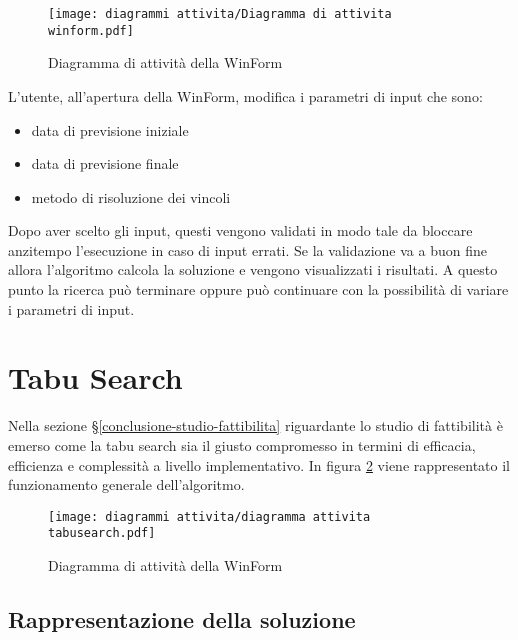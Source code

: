 \begin{figure}[!h] 
    \centering 
    \texttt{[image: diagrammi attivita/Diagramma di attivita winform.pdf]} 
    \caption{Diagramma di attività della WinForm}
    \label{diagramma-attivita-winform}
\end{figure}

\noindent L'utente, all'apertura della WinForm, modifica i parametri di input che sono:
\begin{itemize}
    \item data di previsione iniziale
    \item data di previsione finale
    \item metodo di risoluzione dei vincoli
\end{itemize}
\noindent Dopo aver scelto gli input, questi vengono validati in modo tale da bloccare anzitempo
l'esecuzione in caso di input errati.
Se la validazione va a buon fine allora l'algoritmo calcola la soluzione e vengono visualizzati i risultati.
A questo punto la ricerca può terminare oppure può continuare con la possibilità di variare i parametri di input.

\section{Tabu Search}
\label{sec:tabu-search}
\noindent Nella sezione §\ref{conclusione-studio-fattibilita}
riguardante lo studio di fattibilità è emerso come la tabu search
sia il giusto compromesso in termini di efficacia, efficienza
e complessità a livello implementativo.
In figura \ref{diagramma-attivita-tabu-search}
viene rappresentato il funzionamento generale dell'algoritmo.

\begin{figure}[!h] 
    \centering 
    \texttt{[image: diagrammi attivita/diagramma attivita tabusearch.pdf]} 
    \caption{Diagramma di attività della WinForm}
    \label{diagramma-attivita-tabu-search}
\end{figure}

\subsection{Rappresentazione della soluzione}
\label{sec:rappresentazione-della-soluzione}

